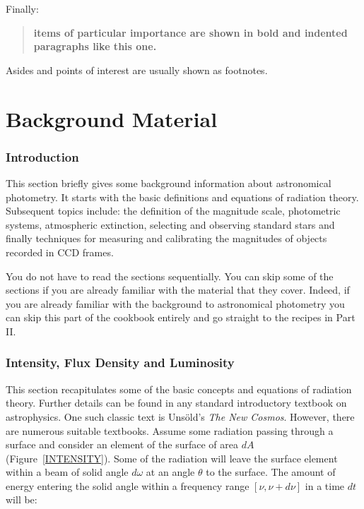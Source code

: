 \documentclass[twoside,11pt]{article}
\newcommand{\stardocinitials}  {SC}
\newcommand{\stardocnumber}    {6.4}
\newcommand{\stardocname}{\stardocinitials /\stardocnumber}
\newcommand{\xlabel}[1]{}
\begin{document}
Finally:

\begin{quote}
{\bf items of particular importance are shown in bold and indented
paragraphs like this one.}
\end{quote}

Asides and points of interest are usually shown as footnotes.


\cleardoublepage
\markboth{\stardocname}{\stardocname}
\part{Background Material}
\markboth{\stardocname}{\stardocname}
\section{\xlabel{INTRO_BACK}\label{INTRO_BACK}Introduction}

This section briefly gives some background information about
astronomical photometry.  It starts with the basic definitions and
equations of radiation theory.  Subsequent topics include: the
definition of the magnitude scale, photometric systems, atmospheric
extinction, selecting and observing standard stars and finally
techniques for measuring and calibrating the magnitudes of objects
recorded in CCD frames.

You do not have to read the sections sequentially.  You can skip some
of the sections if you are already familiar with the material that they
cover.  Indeed, if you are already familiar with the background to
astronomical photometry you can skip this part of the cookbook entirely
and go straight to the recipes in Part II.


\section{\xlabel{IFDL}\label{IFDL}Intensity, Flux Density and Luminosity}

This section recapitulates some of the basic concepts and equations
of radiation theory.  Further details can be found in any standard
introductory textbook on astrophysics.  One such classic text is
Uns\"{o}ld's {\it The New Cosmos}\/\cite{UNSOLD67}.  However, there are
numerous suitable textbooks.  Assume some radiation passing
through a surface and consider an element of the surface of area $dA$
(Figure~\ref{INTENSITY}).  Some of the radiation will leave the surface
element within a beam of solid angle $d\omega$ at an angle $\theta$ to
the surface.  The amount of energy entering the solid angle within a
frequency range $[ \nu, \nu+d\nu ]$ in a time $dt$ will be:
\end{document}
